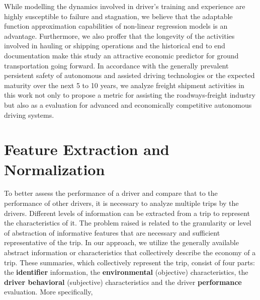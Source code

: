 \documentclass{article}
\begin{document}
While modelling the dynamics involved in driver's training and experience are highly susceptible to failure and stagnation, we believe that the adaptable function approximation capabilities of non-linear regression models is an advantage. Furthermore, we also proffer that the longevity of the activities involved in hauling or shipping operations and the historical end to end documentation make this study an attractive economic predictor for ground transportation going forward. In accordance with the generally prevalent persistent safety of autonomous and assisted driving technologies or the expected maturity over the next 5 to 10 years, we analyze freight shipment activities in this work not only to propose a metric for assisting the roadways-freight industry but also as a evaluation for advanced and economically competitive autonomous driving systems.


\section{Feature Extraction and Normalization}\label{sec:feature_extraction_and_normalization}


To better assess the performance of a driver and compare that to the performance of other drivers, it is necessary to analyze multiple trips by the drivers. Different levels of information can be extracted from a trip to represent the characteristics of it. The problem raised is related to the granularity or level of abstraction of informative features that are necessary and sufficient representative of the trip. In our approach, we utilize the generally available abstract information or characteristics that collectively describe the economy of a trip. These summaries, which collectively represent the trip, consist of four parts: the \textbf{identifier} information, the \textbf{environmental} (objective) characteristics, the \textbf{driver behavioral} (subjective) characteristics and the driver \textbf{performance} evaluation. More specifically,
\end{document}
